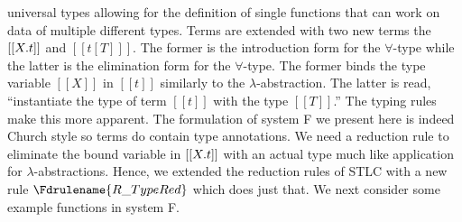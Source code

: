 universal types allowing for the definition of single functions that
can work on data of multiple different types.  Terms are extended with
two new terms the $[[\\X.t]]$ and $[[t [T] ]]$.  The former is the
introduction form for the $\forall$-type while the latter is the
elimination form for the $\forall$-type. The former binds the type
variable $[[X]]$ in $[[t]]$ similarly to the
$\lambda$-abstraction. The latter is read, ``instantiate the type of
term $[[t]]$ with the type $[[T]]$.''  The typing rules make this more
apparent.  The formulation of system F we present here is indeed
Church style so terms do contain type annotations.  We need a
reduction rule to eliminate the bound variable in $[[\\X.t]]$ with an
actual type much like application for $\lambda$-abstractions.  Hence,
we extended the reduction rules of STLC with a new rule
$\Fdrulename{R\_TypeRed}$ which does just that.  We next consider some
example functions in system F.

